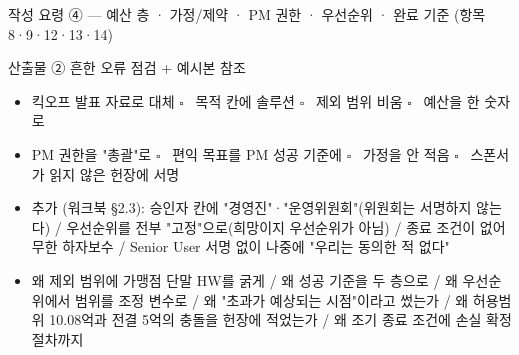 \begin{frame}[allowframebreaks=1.0]{작성 요령 ④ — 예산 층 · 가정/제약 · PM 권한 · 우선순위 · 완료 기준 (항목 8·9·12·13·14)}
\par\smallskip{}\nobreak
{}
\end{frame}

\begin{frame}[allowframebreaks=1.0]{산출물 ② 흔한 오류 점검 + 예시본 참조}
\small
\par\smallskip{}\nobreak
\begin{itemize}
\item[$\square$]\relax 킥오프 발표 자료로 대체 $\square$~ 목적 칸에 솔루션 $\square$~ 제외 범위 비움 $\square$~ 예산을 한 숫자로
\item[$\square$]\relax PM 권한을 "총괄"로 $\square$~ 편익 목표를 PM 성공 기준에 $\square$~ 가정을 안 적음 $\square$~ 스폰서가 읽지 않은 헌장에 서명
\item\relax 추가 (워크북 §2.3): 승인자 칸에 "경영진"·"운영위원회"(위원회는 서명하지 않는다) / 우선순위를 전부 "고정"으로(희망이지 우선순위가 아님) / 종료 조건이 없어 무한 하자보수 / Senior User 서명 없이 나중에 "우리는 동의한 적 없다"
\end{itemize}
\par\smallskip{}\nobreak
\begin{itemize}
\item\relax 왜 제외 범위에 가맹점 단말 HW를 굵게 / 왜 성공 기준을 두 층으로 / 왜 우선순위에서 범위를 조정 변수로 / 왜 "초과가 예상되는 시점"이라고 썼는가 / 왜 허용범위 10.08억과 전결 5억의 충돌을 헌장에 적었는가 / 왜 조기 종료 조건에 손실 확정 절차까지
\end{itemize}
\par\smallskip{}\nobreak

\end{frame}
